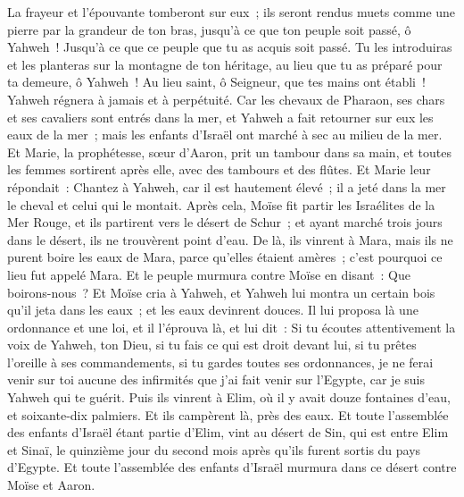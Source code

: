 \begin{multicols}{2}
La frayeur et l'épouvante tomberont sur eux~; ils seront rendus muets comme une pierre par la grandeur de ton bras, jusqu'à ce que ton peuple soit passé, ô Yahweh~! Jusqu'à ce que ce peuple que tu as acquis soit passé.
Tu les introduiras et les planteras sur la montagne de ton héritage, au lieu que tu as préparé pour ta demeure, ô Yahweh~! Au lieu saint, ô Seigneur, que tes mains ont établi~!
Yahweh régnera à jamais et à perpétuité.
Car les chevaux de Pharaon, ses chars et ses cavaliers sont entrés dans la mer, et Yahweh a fait retourner sur eux les eaux de la mer~; mais les enfants d'Israël ont marché à sec au milieu de la mer.
Et Marie, la prophétesse, sœur d'Aaron, prit un tambour dans sa main, et toutes les femmes sortirent après elle, avec des tambours et des flûtes.
Et Marie leur répondait~: Chantez à Yahweh, car il est hautement élevé~; il a jeté dans la mer le cheval et celui qui le montait.
Après cela, Moïse fit partir les Israélites de la Mer Rouge, et ils partirent vers le désert de Schur~; et ayant marché trois jours dans le désert, ils ne trouvèrent point d'eau.
De là, ils vinrent à Mara, mais ils ne purent boire les eaux de Mara, parce qu'elles étaient amères~; c'est pourquoi ce lieu fut appelé Mara.
Et le peuple murmura contre Moïse en disant~: Que boirons-nous~?
Et Moïse cria à Yahweh, et Yahweh lui montra un certain bois qu'il jeta dans les eaux~; et les eaux devinrent douces. Il lui proposa là une ordonnance et une loi, et il l'éprouva là,
et lui dit~: Si tu écoutes attentivement la voix de Yahweh, ton Dieu, si tu fais ce qui est droit devant lui, si tu prêtes l'oreille à ses commandements, si tu gardes toutes ses ordonnances, je ne ferai venir sur toi aucune des infirmités que j'ai fait venir sur l'Egypte, car je suis Yahweh qui te guérit.
Puis ils vinrent à Elim, où il y avait douze fontaines d'eau, et soixante-dix palmiers. Et ils campèrent là, près des eaux.
\VerseOne{}Et toute l'assemblée des enfants d'Israël étant partie d'Elim, vint au désert de Sin, qui est entre Elim et Sinaï, le quinzième jour du second mois après qu'ils furent sortis du pays d'Egypte.
Et toute l'assemblée des enfants d'Israël murmura dans ce désert contre Moïse et Aaron.

\end{multicols}
